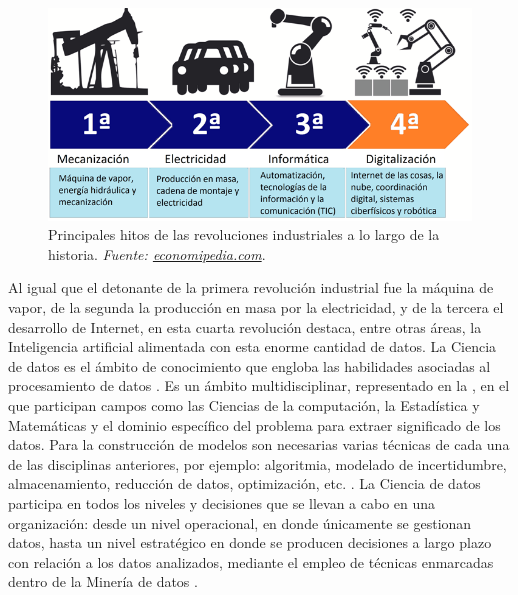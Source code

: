 \documentclass[c5paper,10pt,twoside]{book}	   	%
\begin{document}
\begin{figure}[!hbtp]
	\centering
	\includegraphics[width=0.6\linewidth]{./Figures/Cuarta-Revolucion-Industrial.png}
	\caption[Principales hitos de las revoluciones industriales a lo largo de la historia.]{Principales hitos de las revoluciones industriales a lo largo de la historia. \textit{Fuente: \href{https://economipedia.com}{economipedia.com}}.}
			
	\label{fig:revoluciones}
\end{figure}







Al igual que el detonante de la primera revolución industrial fue la máquina de vapor, de la segunda la producción en masa por la electricidad, y de la tercera el desarrollo de Internet, en esta cuarta revolución destaca, entre otras áreas, la Inteligencia artificial alimentada con esta enorme cantidad de datos. La Ciencia de datos es el ámbito de conocimiento que engloba las habilidades asociadas al procesamiento de datos \cite{Dhar13}. Es un ámbito multidisciplinar, representado en la , en el que participan campos como las Ciencias de la computación, la Estadística y Matemáticas y el dominio específico del problema para extraer significado de los datos. Para la construcción de modelos son necesarias varias técnicas de cada una de las disciplinas anteriores, por ejemplo: algoritmia, modelado de incertidumbre, almacenamiento, reducción de datos, optimización, etc. \cite{Bs17b}. La Ciencia de datos participa en todos los niveles y decisiones que se llevan a cabo en una organización: desde un nivel operacional, en donde únicamente se gestionan datos, hasta un nivel estratégico en donde se producen decisiones a largo plazo con relación a los datos analizados, mediante el empleo de técnicas enmarcadas dentro de la Minería de datos \cite{Shearer2000}.
\end{document}
